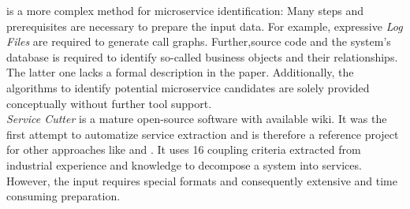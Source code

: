 \cite{HeuristicsAlwis} is a more complex method for microservice identification: Many steps and 
prerequisites are necessary to prepare the input data. For example, expressive \textit{Log Files} are required to generate call graphs. Further,source code and the system's database is required to identify so-called business objects and their relationships. The latter one lacks a formal description in the paper. 
Additionally, the algorithms to identify potential microservice candidates are solely provided conceptually without further tool support. \\

\textit{Service Cutter} \cite{ServiceCutter} is a mature open-source software with available wiki. It was the first attempt to automatize service extraction and is therefore a reference project for other approaches like \cite{ExtractionMazlami} and \cite{DataflowDrivenChen}. It uses 16 coupling criteria extracted from industrial experience and knowledge to decompose a system into services. However, the input requires special formats and consequently extensive and time consuming preparation.








